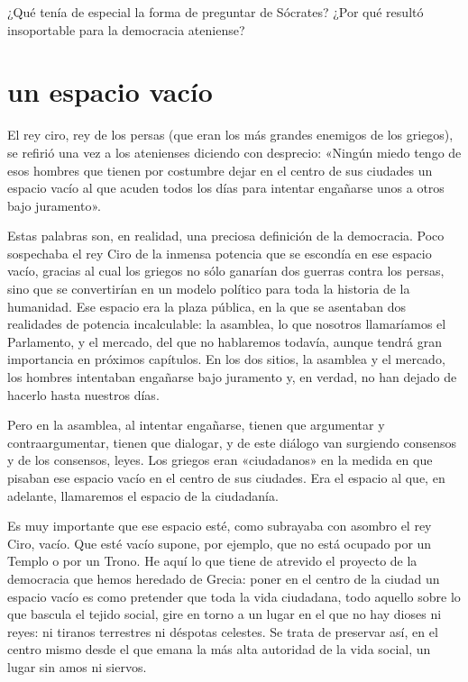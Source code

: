 \documentclass[draft,9pt,letterpaper,twocolumn,openany]{extbook}
\newcommand{\notar}[1]{\marginnote{\small\sffamily #1}[-.8em]}
\begin{document}
¿Qué tenía de especial la forma de preguntar de
Sócrates? ¿Por qué resultó insoportable para la democracia
ateniense?

\section{un espacio vacío}

El rey ciro, rey de los persas (que eran los más grandes
enemigos de los griegos), se refirió una vez a los
atenienses diciendo con desprecio: «Ningún miedo tengo de
esos hombres que tienen por costumbre dejar en el centro
de sus ciudades un espacio vacío al que acuden todos los
días para intentar engañarse unos a otros bajo juramento».

Estas palabras son, en realidad, una preciosa definición de
la democracia. Poco sospechaba el rey Ciro de la inmensa
potencia que se escondía en ese espacio vacío, gracias al
cual los griegos no sólo ganarían dos guerras contra los
persas, sino que se convertirían en un modelo político para
toda la historia de la humanidad. Ese espacio era la plaza
pública, en la que se asentaban dos realidades de potencia
incalculable: la asamblea, lo que nosotros llamaríamos el
Parlamento, y el mercado, del que no hablaremos todavía,
aunque tendrá gran importancia en próximos capítulos. En
los dos sitios, la asamblea y el mercado, los hombres
intentaban engañarse bajo juramento y, en verdad, no han
dejado de hacerlo hasta nuestros días. 

Pero en la
asamblea, al intentar engañarse, tienen que argumentar y
contraargumentar, tienen que dialogar, y de este diálogo van
surgiendo consensos y de los consensos, leyes. Los
griegos eran «ciudadanos» en la medida en que pisaban ese
espacio vacío en el centro de sus ciudades. Era el espacio
al que, en adelante, llamaremos el espacio de la
ciudadanía.

Es muy importante que ese espacio esté, como subrayaba
con asombro el rey Ciro, vacío. Que esté vacío supone,
por ejemplo, que no está ocupado por un Templo o por un
Trono. He aquí lo que tiene de atrevido el proyecto de la
democracia que hemos heredado de Grecia: poner en el
centro de la ciudad un espacio vacío es como pretender que
toda la vida ciudadana, todo aquello sobre lo que bascula el
tejido social, gire en torno a un lugar en el que no hay
dioses ni reyes: ni tiranos terrestres ni déspotas celestes.
Se trata de preservar así, en el centro mismo desde el que
emana la más alta autoridad de la vida social, un lugar sin
amos ni siervos. 
\end{document}
